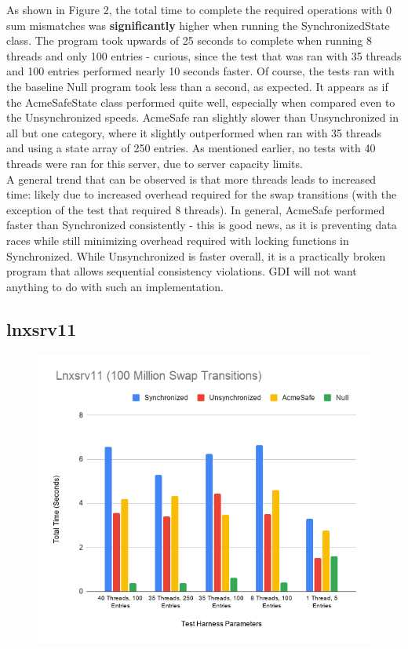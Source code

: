 As shown in Figure 2, the total time to complete the required operations with 0 sum mismatches was \textbf{significantly} higher when running the SynchronizedState class. The program took upwards of 25 seconds to complete when running 8 threads and only 100 entries - curious, since the test that was ran with 35 threads and 100 entries performed nearly 10 seconds faster. Of course, the tests ran with the baseline Null program took less than a second, as expected. It appears as if the AcmeSafeState class performed quite well, especially when compared even to the Unsynchronized speeds. AcmeSafe ran slightly slower than Unsynchronized in all but one category, where it slightly outperformed when ran with 35 threads and using a state array of 250 entries. As mentioned earlier, no tests with 40 threads were ran for this server, due to server capacity limits. 
\\

A general trend that can be observed is that more threads leads to increased time: likely due to increased overhead required for the swap transitions (with the exception of the test that required 8 threads). In general, AcmeSafe performed faster than Synchronized consistently - this is good news, as it is preventing data races while still minimizing overhead required with locking functions in Synchronized. While Unsynchronized is faster overall, it is a practically broken program that allows sequential consistency violations. GDI will not want anything to do with such an implementation.
\\


\subsection{lnxsrv11} 
\begin {figure}
\caption{}
\includegraphics[scale=.45]{lnxsrv11.png}  
\end{figure}

